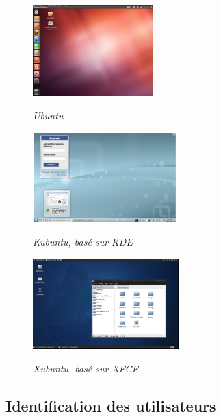 \documentclass[11pt,oneside]{article}
\begin{document}
\begin{figure}[H]
\begin{minipage}[c]{.33\linewidth}
\begin{center}
\includegraphics[height=3.5cm]{images/unity.jpg}

\textit{Ubuntu}
\end{center}
\end{minipage} \hfill
\begin{minipage}[c]{.33\linewidth}
\begin{center}
\includegraphics[height=3.5cm]{images/kbuntu.jpg}

\textit{Kubuntu, basé sur KDE}
\end{center}
\end{minipage} \hfill
\begin{minipage}[c]{.33\linewidth}

\begin{center}
\includegraphics[height=3.5cm]{images/xbuntu.jpg}

\textit{Xubuntu, basé sur XFCE}
\end{center}
\end{minipage} 
\end{figure}

\subsection{Identification des utilisateurs}
\end{document}
